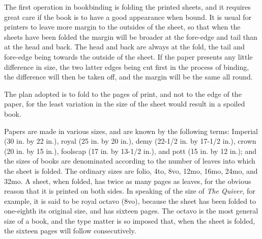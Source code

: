 \documentclass[twoside]{book}
\begin{document}
\noindent
The first operation in bookbinding is folding the
printed sheets, and it requires great care if the book
is to have a good appearance when bound. It is
usual for printers to leave more margin to the outsides
of the sheet, so that when the sheets have
been folded the margin will be broader at the
fore-edge and tail than at the head and back. The
head and back are always at the fold, the tail and
fore-edge being towards the outside of the sheet. If
the paper presents any little difference in size, the
two latter edges being cut first in the process of
binding, the difference will then be taken off, and
the margin will be the same all round.

The plan adopted is to fold to the pages of print,
and not to the edge of the paper, for the least
variation in the size of the sheet would result in a
spoiled book.

Papers are made in various sizes, and are known
by the following terms: Imperial (30 in. by 22 in.),
royal (25 in. by 20 in.), demy (22-1/2 in. by 17-1/2 in.),
crown (20 in. by 15 in.), foolscap (17 in. by 13-1/2 in.),
and pott (15 in. by 12 in.); and the sizes of books
are denominated according to the number of leaves
into which the sheet is folded. The ordinary sizes
are folio, 4to, 8vo, 12mo, 16mo, 24mo, and 32mo.
A sheet, when folded, has twice as many pages as
leaves, for the obvious reason that it is printed on
both sides. In speaking of the size of \textit{The Quiver},
for example, it is said to be royal octavo (8vo),
because the sheet has been folded to one-eighth its
original size, and has sixteen pages. The octavo is
\pagebreak
the most general size of a book, and the type matter
is so imposed that, when the sheet is folded, the
sixteen pages will follow consecutively.
\end{document}
